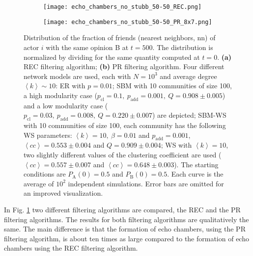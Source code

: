 \documentclass[11 pt , letterpaper , twoside , openright]{book}
\begin{document}
\begin{figure}[H]
  \begin{subfigure}[b]{0.49\textwidth}
    \caption{}
  	\texttt{[image: echo\_chambers\_no\_stubb\_50-50\_REC.png]}
      \end{subfigure}
  \begin{subfigure}[b]{0.49\textwidth}
    \caption{}
  	\texttt{[image: echo\_chambers\_no\_stubb\_50-50\_PR\_8x7.png]}
  \end{subfigure}
  \captionsetup{format=plain}
  \caption[Distribution of the fraction of friends (nearest neighbors, nn) of actor $i$ with the same opinion B at $t=500$, $\left<P_{\text{B}}^{\text{nn}}\right>$, for an initial $50/50$ opinion distribution.]{Distribution of the fraction of friends (nearest neighbors, nn) of actor $i$ with the same opinion B at $t = 500$. The distribution is normalized by dividing for the same quantity computed at $t=0$. \textbf{(a)} REC filtering algorithm; \textbf{(b)} PR filtering algorithm. Four different network models are used, each with $N = 10^3$ and average degree $\left<k\right> \sim 10$: ER with $p = 0.01$; SBM with 10 communities of size 100, a high modularity case ($p_{\text{cl}} = 0.1,\ p_{\text{add}} = 0.001,\ Q = 0.908 \pm 0.005$) and a low modularity case ($p_{\text{cl}} = 0.03,\ p_{\text{add}} = 0.008,\ Q = 0.220 \pm 0.007$) are depicted; SBM-WS with 10 communities of size 100, each community has the following WS parameters: $\left<k\right> = 10,\ \beta = 0.01$ and $p_{\text{add}} = 0.001$, $\left<cc\right> = 0.553 \pm 0.004$ and $Q = 0.909 \pm 0.004$; WS with $\left<k\right> = 10$, two slightly different values of the clustering coefficient are used ($\left<cc\right> = 0.557 \pm 0.007$ and $\left<cc\right> = 0.648 \pm 0.003$). The starting conditions are $P_{\text{A}}(0) = 0.5$ and $P_{\text{B}}(0) = 0.5$. Each curve is the average of $10^2$ independent simulations. Error bars are omitted for an improved visualization.}
\label{echo_50_50}
\end{figure}
\noindent
In Fig. \ref{echo_50_50} two different filtering algorithms are compared, the REC and the PR filtering algorithms. The results for both filtering algorithms are qualitatively the same. The main difference is that the formation of echo chambers, using the PR filtering algorithm, is about ten times as large compared to the formation of echo chambers using the REC filtering algorithm. \\
\newline
\end{document}
